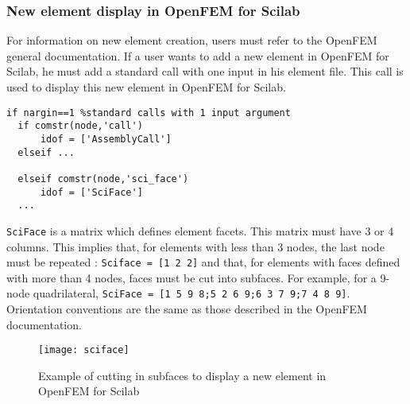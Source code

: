 \subsubsection{New element display in OpenFEM for Scilab} 
For information on new element creation, users must refer to the OpenFEM general documentation. If a user wants to add a new element in OpenFEM for Scilab, he must add a standard call with one input in his element file. This call is used to display this new element in OpenFEM for Scilab.
\begin{verbatim}
if nargin==1 %standard calls with 1 input argument
  if comstr(node,'call')
      idof = ['AssemblyCall']
  elseif ...

  elseif comstr(node,'sci_face')
      idof = ['SciFace']
  ...
\end{verbatim}
\verb+SciFace+ is a matrix which defines element facets. This matrix must have 3 or 4 columns. This implies that, for elements with less than 3 nodes, the last node must be repeated : \verb+Sciface = [1 2 2]+ and that, for elements with faces defined with more than 4 nodes, faces must be cut into subfaces. For example, for a 9-node quadrilateral, \verb+SciFace = [1 5 9 8;5 2 6 9;6 3 7 9;7 4 8 9]+. Orientation conventions are the same as those described in the OpenFEM documentation. 
\begin{figure}[!hbp]
\begin{center}
\texttt{[image: sciface]}
\caption{Example of cutting in subfaces to display a new element in OpenFEM for Scilab}
\label{sci_face}
\end{center}
\end{figure}

